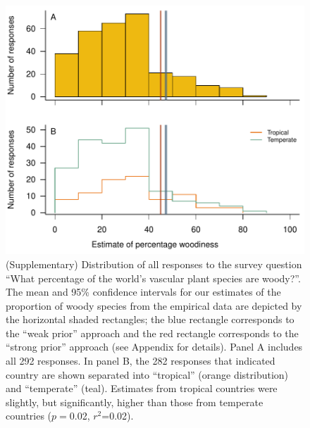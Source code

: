 \documentclass[a4paper,12pt]{article}
\begin{document}
\begin{figure}[p]
  \centering
  \includegraphics{figs/survey-distribution}
  \caption{(Supplementary) Distribution of all responses to the survey
    question ``What percentage of the world's vascular plant species
    are woody?''.
    The mean and 95\% confidence intervals for our estimates of the
    proportion of woody species from the empirical data are depicted
    by the horizontal shaded rectangles; the blue rectangle
    corresponds to the ``weak prior'' approach and the red rectangle
    corresponds to the ``strong prior'' approach (see Appendix for
    details).  
    Panel A includes all 292 responses.  In panel B, the 282
    responses that indicated country are shown separated into
    ``tropical'' (orange distribution) and ``temperate'' (teal).
    Estimates from tropical countries were slightly, but
    significantly, higher than those from temperate countries
    ($p=$0.02, $r^2$=0.02).
  }

  \label{fig:survey-distribution}
\end{figure}
\end{document}
